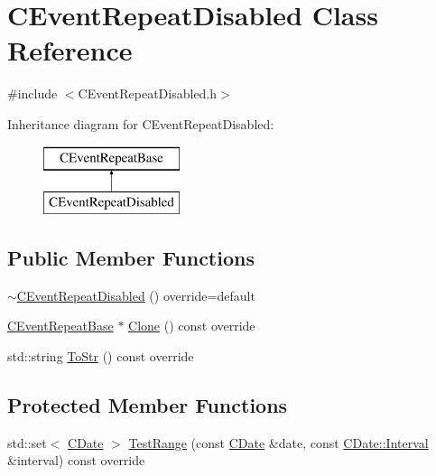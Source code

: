 \hypertarget{class_c_event_repeat_disabled}{}\section{C\+Event\+Repeat\+Disabled Class Reference}
\label{class_c_event_repeat_disabled}


{\ttfamily \#include $<$C\+Event\+Repeat\+Disabled.\+h$>$}

Inheritance diagram for C\+Event\+Repeat\+Disabled\+:\begin{figure}[H]
\begin{center}
\leavevmode
\includegraphics[height=2.000000cm]{class_c_event_repeat_disabled}
\end{center}
\end{figure}
\subsection*{Public Member Functions}
\begin{DoxyCompactItemize}
\item 
\mbox{\hyperlink{class_c_event_repeat_disabled_a3ab08c68323db33b823f3232b02dd5ac}{$\sim$\+C\+Event\+Repeat\+Disabled}} () override=default
\item 
\mbox{\hyperlink{class_c_event_repeat_base}{C\+Event\+Repeat\+Base}} $\ast$ \mbox{\hyperlink{class_c_event_repeat_disabled_afc00861b70904d48410ea17db3555da1}{Clone}} () const override
\item 
std\+::string \mbox{\hyperlink{class_c_event_repeat_disabled_a58cfa9f6921c351c85f747e80183842b}{To\+Str}} () const override
\end{DoxyCompactItemize}
\subsection*{Protected Member Functions}
\begin{DoxyCompactItemize}
\item 
std\+::set$<$ \mbox{\hyperlink{class_c_date}{C\+Date}} $>$ \mbox{\hyperlink{class_c_event_repeat_disabled_a0d9196c321d405660223d46c3c1ab27e}{Test\+Range}} (const \mbox{\hyperlink{class_c_date}{C\+Date}} \&date, const \mbox{\hyperlink{class_c_date_af23472c977b14ed341b48183ec19d874}{C\+Date\+::\+Interval}} \&interval) const override
\end{DoxyCompactItemize}

